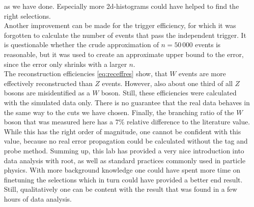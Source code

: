 \documentclass[twoside,        %
               BCOR12mm,       %
               ngerman,english, %
               fleqn,headsepline=false,footsepline=false
              ]{Vorlage/MFPREPORT}
\begin{document}
as we have done. Especially more 2d-histograms could have helped to find the
right selections.\\
Another improvement can be made for the trigger efficiency, for which it was
forgotten to calculate the number of events that pass the independent trigger.
It is questionable whether the crude approximation of $n=50\,000$ events is
reasonable, but it was used to create an approximate upper bound to the error,
since the error only shrinks with a larger $n$.\\
The reconstruction efficiencies \cref{eq:receffres} show, that $W$ events are
more effectively reconstructed than $Z$ events. However, also about one third
of all $Z$ bosons are misidentified as a $W$ boson. Still, these efficiencies
were calculated with the simulated data only. There is no guarantee that the
real data behaves in the same way to the cuts we have chosen.
Finally, the branching ratio of the $W$ boson that was measured here has a 7\%
relative difference to the literature value. While this has the right order of
magnitude, one cannot be confident with this value, because no real error
propagation could be calculated without the tag and probe method. 
Summing up, this lab has provided a very nice introduction into data analysis
with root, as well as standard practices commonly used in particle physics.
With more background knowledge one could have spent more time on finetuning the
selections which in turn could have provided a better end result. Still,
qualitatively one can be content with the result that was found in a few hours
of data analysis.

\newpage
\end{document}
